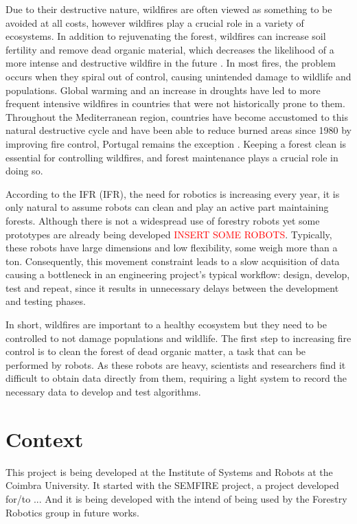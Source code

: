 Due to their destructive nature, wildfires are often viewed as something to be avoided at all costs, however wildfires play a crucial role in a variety of ecosystems. In addition to rejuvenating the forest, wildfires can increase soil fertility and remove dead organic material, which decreases the likelihood of a more intense and destructive wildfire in the future \cite{bond_fires_2017}. In most fires, the problem occurs when they spiral out of control, causing unintended damage to wildlife and populations. Global warming and an increase in droughts have led to more frequent intensive wildfires in countries that were not historically prone to them. Throughout the Mediterranean region, countries have become accustomed to this natural destructive cycle and have been able to reduce burned areas since 1980 by improving fire control, Portugal remains the exception \cite{turco_decreasing_2016}\cite{european_commission_joint_research_centre_forest_2021}. Keeping a forest clean is essential for controlling wildfires, and forest maintenance plays a crucial role in doing so.

According to the \acl{IFR} (\acs{IFR}), the need for robotics is increasing every year, it is only natural to assume robots can clean and play an active part maintaining forests. Although there is not a widespread use of forestry robots yet some prototypes are already being developed \textcolor{red}{INSERT SOME ROBOTS}. Typically, these robots have large dimensions and low flexibility, some weigh more than a ton. Consequently, this movement constraint leads to a slow acquisition of data causing a bottleneck in an engineering project's typical workflow: design, develop, test and repeat, since it results in unnecessary delays between the development and testing phases.

In short, wildfires are important to a healthy ecosystem but they need to be controlled to not damage populations and wildlife. The first step to increasing fire control is to clean the forest of dead organic matter, a task that can be performed by robots. As these robots are heavy, scientists and researchers find it difficult to obtain data directly from them, requiring a light system to record the necessary data to develop and test algorithms.

\section{Context}

This project is being developed at the Institute of Systems and Robots at the Coimbra University. It started with the SEMFIRE project, a project developed for/to ... And it is being developed with the intend of being used by the Forestry Robotics group in future works.

